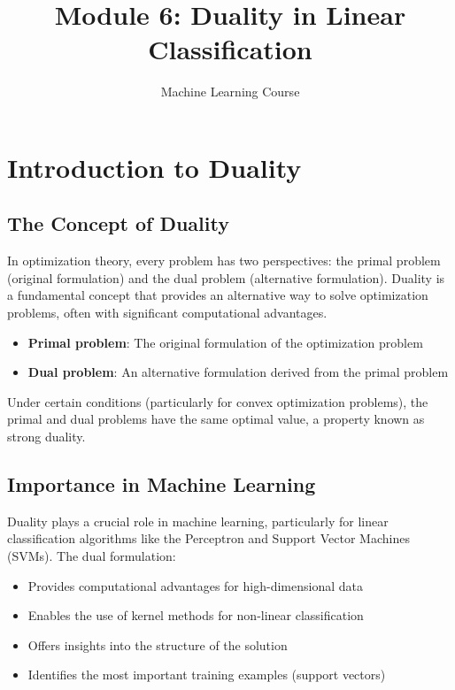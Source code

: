 \documentclass{article}
\title{Module 6: Duality in Linear Classification}
\author{Machine Learning Course}
\date{}
\begin{document}
\maketitle
\tableofcontents
\newpage

\section{Introduction to Duality}

\subsection{The Concept of Duality}
In optimization theory, every problem has two perspectives: the primal problem (original formulation) and the dual problem (alternative formulation). Duality is a fundamental concept that provides an alternative way to solve optimization problems, often with significant computational advantages.

\begin{itemize}
    \item \textbf{Primal problem}: The original formulation of the optimization problem
    \item \textbf{Dual problem}: An alternative formulation derived from the primal problem
\end{itemize}

Under certain conditions (particularly for convex optimization problems), the primal and dual problems have the same optimal value, a property known as strong duality.

\subsection{Importance in Machine Learning}
Duality plays a crucial role in machine learning, particularly for linear classification algorithms like the Perceptron and Support Vector Machines (SVMs). The dual formulation:

\begin{itemize}
    \item Provides computational advantages for high-dimensional data
    \item Enables the use of kernel methods for non-linear classification
    \item Offers insights into the structure of the solution
    \item Identifies the most important training examples (support vectors)
\end{itemize}
\end{document}
